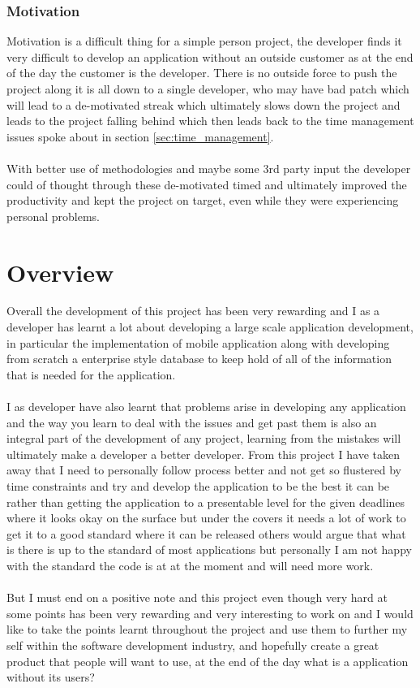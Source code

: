 \subsubsection{Motivation}
\label{sec:motivation}

Motivation is a difficult thing for a simple person project, the developer finds it very difficult to develop an application without an outside customer as at the end of the day the customer is the developer. There is no outside force to push the project along it is all down to a single developer, who may have bad patch which will lead to a de-motivated streak which ultimately slows down the project and leads to the project falling behind which then leads back to the time management issues spoke about in section \ref{sec:time_management}.\\
\\
With better use of methodologies and maybe some 3rd party input the developer could of thought through these de-motivated timed and ultimately improved the productivity and kept the project on target, even while they were experiencing personal problems.

\section{Overview}

Overall the development of this project has been very rewarding and I as a developer has learnt a lot about developing a large scale application development, in particular the implementation of mobile application along with developing from scratch a enterprise style database to keep hold of all of the information that is needed for the application.\\
\\
I as developer have also learnt that problems arise in developing any application and the way you learn to deal with the issues and get past them is also an integral part of the development of any project, learning from the mistakes will ultimately make a developer a better developer. From this project I have taken away that I need to personally follow process better and not get so flustered by time constraints and try and develop the application to be the best it can be rather than getting the application to a presentable level for the given deadlines where it looks okay on the surface but under the covers it needs a lot of work to get it to a good standard where it can be released others would argue that what is there is up to the standard of most applications but personally I am not happy with the standard the code is at at the moment and will need more work.\\
\\
But I must end on a positive note and this project even though very hard at some points has been very rewarding and very interesting to work on and I would like to take the points learnt throughout the project and use them to further my self within the software development industry, and hopefully create a great product that people will want to use, at the end of the day what is a application without its users?